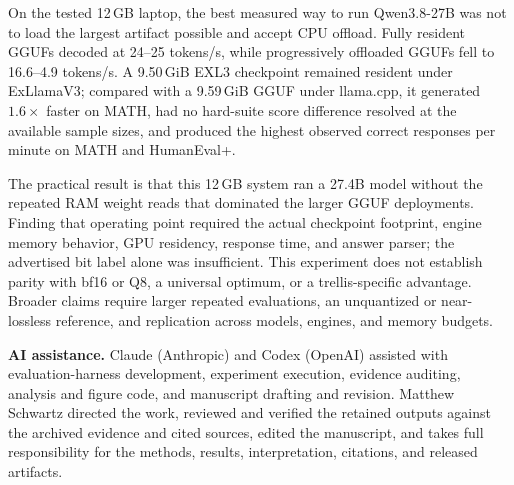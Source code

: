 \documentclass[11pt]{article}
\begin{document}
On the tested 12\,GB laptop, the best measured way to run Qwen3.8-27B was not
to load the largest artifact possible and accept CPU offload. Fully resident
GGUFs decoded at 24--25 tokens/s, while progressively offloaded GGUFs fell to
16.6--4.9 tokens/s. A 9.50\,GiB EXL3 checkpoint remained resident under
ExLlamaV3; compared with a 9.59\,GiB GGUF under llama.cpp, it generated
$1.6\times$ faster on MATH, had no hard-suite score difference resolved at the
available sample sizes, and produced the highest observed correct responses
per minute on MATH and HumanEval+.

The practical result is that this 12\,GB system ran a 27.4B model without the
repeated RAM weight reads that dominated the larger GGUF deployments. Finding
that operating point required the actual checkpoint footprint, engine memory
behavior, GPU residency, response time, and answer parser; the advertised bit
label alone was insufficient. This experiment does not establish parity with
bf16 or Q8, a universal optimum, or a trellis-specific advantage. Broader
claims require larger repeated evaluations, an unquantized or near-lossless
reference, and replication across models, engines, and memory budgets.

\medskip
\noindent\textbf{AI assistance.} Claude (Anthropic) and Codex (OpenAI) assisted
with evaluation-harness development, experiment execution, evidence auditing,
analysis and figure code, and manuscript drafting and revision. Matthew
Schwartz directed the work, reviewed and verified the retained outputs against
the archived evidence and cited sources, edited the manuscript, and takes full
responsibility for the methods, results, interpretation, citations, and
released artifacts.




\end{document}
